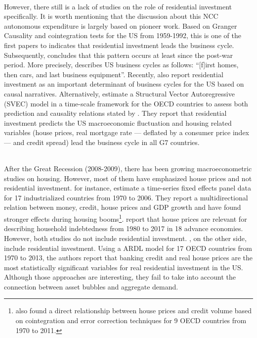 \documentclass[12pt, a4]{article}
\begin{document}
\\
However, there still is a lack of studies on the role of residential investment specifically.
It is worth mentioning that the discussion about this NCC autonomous expenditure is largely based on \textcite{green_follow_1997} pioneer work.
Based on Granger Causality and cointegration tests for the US from 1959-1992, this is one of the first papers to indicates that residential investment leads the business cycle.
Subsequently, \textcite{leamer_housing_2007} concludes that this pattern occurs at least since the post-war period.
More precisely,  \textcite[p.~8]{leamer_housing_2007} describes US business cycles as follows: ``[f]irst homes, then cars,
and last business equipment''.
Recently, \textcites{fiebiger_semi-autonomous_2018}{fiebiger_trend_2017} also report residential investment as an important determinant of business cycles for the US based on causal narratives.
Alternatively, \textcite{huang_is_2020} estimate a Structural Vector Autoregressive (SVEC) model in a time-scale framework for the OECD countries to assess both prediction and causality relations stated by \textcite{leamer_housing_2007}.
They report that residential investment predicts the US  macroeconomic fluctuation and housing related variables (house prices, real mortgage rate --- deflated by a consumer price index --- and credit spread) lead the business cycle in all G7 countries.

\\
After the Great Recession (2008-2009), there has been growing macroeconometric studies on housing.
However, most of them have emphasized house prices and not residential investment.
\textcite{goodhart_house_2008} for instance, estimate a time-series fixed effects panel data for 17 industrialized countries from 1970 to 2006. They report a multidirectional relation between money, credit, house prices and GDP growth and have found stronger effects during housing booms\footnote{\textcite{Arestis_Bank_2014} also found a  direct relationship between house prices and credit volume based on cointegration and error correction techniques for 9 OECD countries from 1970 to 2011.}. 
\textcite{wood_house_2020} report that house prices are relevant for describing household indebtedness from 1980 to 2017 in 18 advance economies.
However, both studies do not include residential investment.
\textcite{Arestis_Residential_2014}, on the other side, include residential investment. Using a ARDL model for 17 OECD countries from 1970 to 2013, the authors report that banking credit and real house prices are the most statistically significant variables for real residential investment in the US.
Although those approaches are interesting, they fail to take into account the connection between asset bubbles and aggregate demand.
\end{document}
